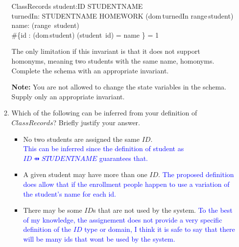 \documentclass{article}
\begin{document}
\begin{enumerate}
\begin{enumerate}
\begin{zed}
\end{zed}
\begin{schema}{ClassRecords}
    student:ID \pfun STUDENTNAME \\
    turnedIn: STUDENTNAME \pfun \power HOMEWORK
\where
\color{blue}
(dom\,turnedIn \subseteq range\,student) \land \\
\color{blue}
\forall name: (range\, student) \bullet \\
\color{blue}
\#\{id : (dom\,student) \vert (student\, id) = name \} = 1
\end{schema}
\color{blue}
The only limitation if this invariant is that it does not support homonyms, meaning two students with the same name, homonyms. \\
\color{black}
Complete the schema with an appropriate invariant.

\textbf{Note:} You are not allowed to change the state variables
in the schema. Supply only an appropriate invariant.


\item Which of the following can be inferred from your definition
of $ClassRecords$? Briefly justify your answer.

\begin{itemize}
\item No two students are assigned the same $ID$.
  \\
  \textcolor{blue}{This can be inferred since the definition of student as $ID \pfun STUDENTNAME$ guarantees that.\\
  }

\item A given student may have more than one $ID$.
  \textcolor{blue}{The proposed definition does allow that if the enrollment people happen to use a variation of the student's name for each id.}

\item There may be some $ID$s that are not used by the system.
  \textcolor{blue}{To the best of my knowledge, the assignement does not provide a very specific definition of the $ID$ type or domain, I think it is safe to say that there will be many ids that wont be used by the system.}


\end{itemize}
\end{enumerate}
\end{enumerate}
\end{document}
